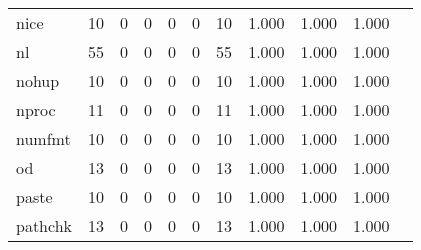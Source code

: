 \begin{longtable}{lp{1.10cm}p{1.10cm}p{1.10cm}p{1.10cm}p{1.10cm}p{1.10cm}p{1.10cm}p{1.10cm}p{1.10cm}p{1.10cm}}
nice      &                     10 &                                  0 &                                 0 &                                0 &                                 0 &                              10 &                          1.000 &                                 1.000 &                               1.000 \\
nl        &                     55 &                                  0 &                                 0 &                                0 &                                 0 &                              55 &                          1.000 &                                 1.000 &                               1.000 \\
nohup     &                     10 &                                  0 &                                 0 &                                0 &                                 0 &                              10 &                          1.000 &                                 1.000 &                               1.000 \\
nproc     &                     11 &                                  0 &                                 0 &                                0 &                                 0 &                              11 &                          1.000 &                                 1.000 &                               1.000 \\
numfmt    &                     10 &                                  0 &                                 0 &                                0 &                                 0 &                              10 &                          1.000 &                                 1.000 &                               1.000 \\
od        &                     13 &                                  0 &                                 0 &                                0 &                                 0 &                              13 &                          1.000 &                                 1.000 &                               1.000 \\
paste     &                     10 &                                  0 &                                 0 &                                0 &                                 0 &                              10 &                          1.000 &                                 1.000 &                               1.000 \\
pathchk   &                     13 &                                  0 &                                 0 &                                0 &                                 0 &                              13 &                          1.000 &                                 1.000 &                               1.000 \\

\end{longtable}
